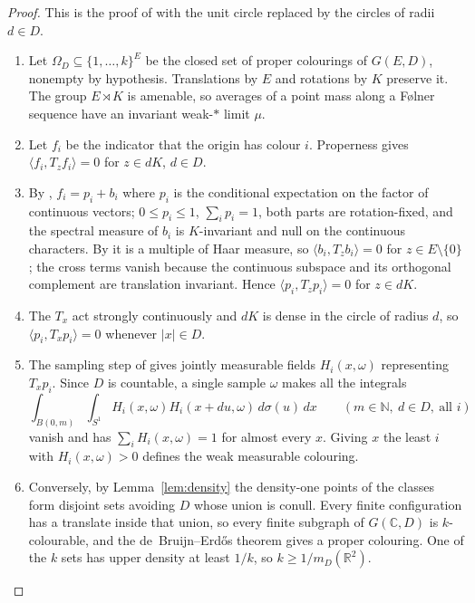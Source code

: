 \documentclass[11pt,a4paper]{amsart}
\theoremstyle{definition}
\theoremstyle{remark}
\newcommand{\C}{\mathbb{C}}
\newcommand{\R}{\mathbb{R}}
\newcommand{\N}{\mathbb{N}}
\begin{document}
\begin{proof}
This is the proof of \cite[Thm.~1.3]{OpenAI} with the unit circle replaced by the circles of radii $d\in D$.
\begin{enumerate}
\item Let $\Omega_D\subseteq\{1,\dots,k\}^E$ be the closed set of proper colourings of $G(E,D)$, nonempty by
hypothesis. Translations by $E$ and rotations by $K$ preserve it. The group $E\rtimes K$ is amenable, so averages of a
point mass along a F\o lner sequence have an invariant weak-$*$ limit $\mu$.
\item Let $f_i$ be the indicator that the origin has colour $i$. Properness gives $\langle f_i,T_zf_i\rangle=0$ for
$z\in dK$, $d\in D$.
\item By \cite[Lemma~4.1]{OpenAI}, $f_i=p_i+b_i$ where $p_i$ is the conditional expectation on the factor of
continuous vectors; $0\le p_i\le1$, $\sum_ip_i=1$, both parts are rotation-fixed, and the spectral measure of $b_i$ is
$K$-invariant and null on the continuous characters. By \cite[Thm.~2.3]{OpenAI} it is a multiple of Haar measure, so
$\langle b_i,T_zb_i\rangle=0$ for $z\in E\setminus\{0\}$; the cross terms vanish because the continuous subspace and
its orthogonal complement are translation invariant. Hence $\langle p_i,T_zp_i\rangle=0$ for $z\in dK$.
\item The $T_x$ act strongly continuously and $dK$ is dense in the circle of radius $d$, so
$\langle p_i,T_xp_i\rangle=0$ whenever $|x|\in D$.
\item The sampling step of \cite[Prop.~4.2]{OpenAI} gives jointly measurable fields $H_i(x,\omega)$ representing
$T_xp_i$. Since $D$ is countable, a single sample $\omega$ makes all the integrals
\[
\int_{B(0,m)}\int_{S^1}H_i(x,\omega)H_i(x+du,\omega)\,d\sigma(u)\,dx\qquad(m\in\N,\ d\in D,\ \text{all } i)
\]
vanish and has $\sum_iH_i(x,\omega)=1$ for almost every $x$. Giving $x$ the least $i$ with $H_i(x,\omega)>0$ defines the weak
measurable colouring.
\item Conversely, by Lemma~\ref{lem:density} the density-one points of the classes form disjoint sets avoiding $D$
whose union is conull. Every finite configuration has a translate inside that union, so every finite subgraph of
$G(\C,D)$ is $k$-colourable, and the de~Bruijn--Erd\H{o}s theorem \cite{dBE} gives a proper colouring. One of the $k$
sets has upper density at least $1/k$, so $k\ge 1/m_D(\R^2)$.\qedhere
\end{enumerate}
\end{proof}
\end{document}
